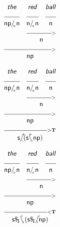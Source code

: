 \documentclass{article}
\newcommand{\deriv}[2]
{  \renewcommand{\arraystretch}{.5}
$\begin{array}[t]{*{#1}{c}}
     #2
   \end{array}$ }
\newcommand{\gf}[1]{\textsf{\textsl{#1}}}
\newcommand{\cf}[1]{\mbox{\ensuremath{\cfont{#1}}}}
\newcommand{\uline}[1]
{\mc{#1}{\hrulefill} }
\newcommand{\mc}[2]
  {\multicolumn{#1}{c}{#2}}
\newcommand{\cfont}{\mathsf}
\newcommand{\bs}{\backslash}
\newcommand{\subsa}[1]{\hspace{-0.75mm}_{_{#1}}}
\newcommand{\subsb}[1]{\hspace{-0.10mm}_{_{#1}}}
\newcommand{\subs}[1]{\hspace{-0.40mm}_{#1}}
\newcommand{\supsa}[1]{\hspace{-1.75mm}^{^{#1}} }
\newcommand{\supsb}[1]{\hspace{-0.80mm}^{^{#1}}  }
\begin{document}
\deriv{3}{
\gf{the} & \gf{red} & \gf{ball} \\
\uline{1} & \uline{1} & \uline{1} \\
\cf{np/ \subsa{\diamond} n} & \cf{n/ \subsa{\diamond} n} & \cf{n} \\
& \mc{2} {\hrulefill_{>}} \\
& \mc{2}{\cf{n}} \\
 \mc{3} {\hrulefill_{>}} \\
 \mc{3}{\cf{np}} \\
}

\vspace{5mm}

\deriv{3}{
\gf{the} & \gf{red} & \gf{ball} \\
\uline{1} & \uline{1} & \uline{1} \\
\cf{np/ \subsa{\diamond} n} & \cf{n/ \subsa{\diamond} n} & \cf{n} \\
& \mc{2} {\hrulefill_{>}} \\
& \mc{2}{\cf{n}} \\
 \mc{3} {\hrulefill_{>}} \\
 \mc{3}{\cf{np}} \\
 \mc{3} {\hrulefill_{>\mathbf{T}}}\\
 \mc{3}{\cf{s/ \supsb{+} \hspace{-1.45mm} \subsa{i} (s\bs \supsa{+} \hspace{-0.50mm} \subsb{i} np)}} \\
}

\vspace{5mm}

\deriv{3}{
\gf{the} & \gf{red} & \gf{ball} \\
\uline{1} & \uline{1} & \uline{1} \\
\cf{np/ \subsa{\diamond} n} & \cf{n/ \subsa{\diamond} n} & \cf{n} \\
& \mc{2} {\hrulefill_{>}} \\
& \mc{2}{\cf{n}} \\
 \mc{3} {\hrulefill_{>}} \\
 \mc{3}{\cf{np}} \\
 \mc{3} {\hrulefill_{<\mathbf{T}}}\\
 \mc{3}{\cf{s\$ \subs{1}\bs \supsa{+} \hspace{-0.50mm} \subsb{i} (s\$ \subs{1}/ \supsb{+} \hspace{-1.45mm} \subsa{i} np)}} \\
}

\vspace{5mm}
\end{document}
